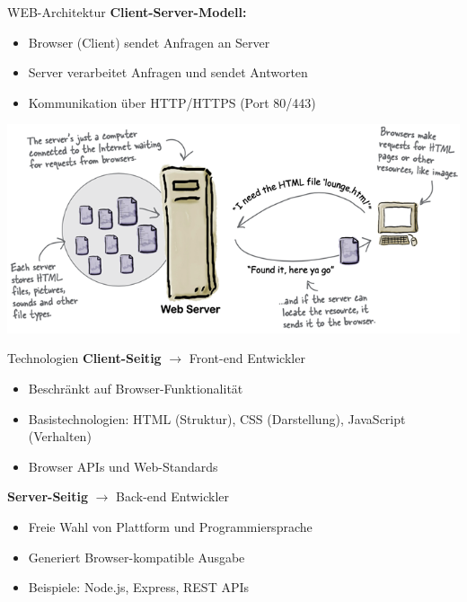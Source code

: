 \begin{definition}{WEB-Architektur}
    \textbf{Client-Server-Modell:}
    \begin{itemize}
        \item Browser (Client) sendet Anfragen an Server
        \item Server verarbeitet Anfragen und sendet Antworten
        \item Kommunikation über HTTP/HTTPS (Port 80/443)
    \end{itemize}
    \includegraphics[width=1\linewidth]{images/web_architektur.png}
\end{definition}

\begin{concept}{Technologien}
    \textbf{Client-Seitig} $\rightarrow$ Front-end Entwickler
    \begin{itemize}
        \item Beschränkt auf Browser-Funktionalität
        \item Basistechnologien: HTML (Struktur), CSS (Darstellung), JavaScript (Verhalten)
        \item Browser APIs und Web-Standards
    \end{itemize}

    \textbf{Server-Seitig} $\rightarrow$ Back-end Entwickler
    \begin{itemize}
        \item Freie Wahl von Plattform und Programmiersprache
        \item Generiert Browser-kompatible Ausgabe
        \item Beispiele: Node.js, Express, REST APIs
    \end{itemize}
\end{concept}

